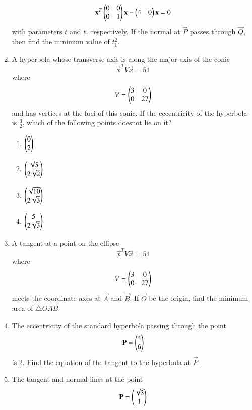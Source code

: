 \documentclass[journal,12pt,twocolumn]{IEEEtran}
\begin{document}
\begin{enumerate}[label=\arabic*.]
\begin{equation}
\mathbf{x}^T\begin{pmatrix}0 & 0 \\ 0 & 1\end{pmatrix}\mathbf{x} -\begin{pmatrix}4 & 0 \end{pmatrix}\mathbf{x} 
 = 0
\end{equation}
with parameters $t$ and $t_1$ respectively.  If the normal at $\vec{P} $ passes through $\vec{Q}$, then find 
the minimum value of $t_1^2$.
\item A hyperbola whose transverse axis is along the major axis of the conic
\begin{equation}
\vec{x}^TV\vec{x} =51
\end{equation}
%
where
\begin{equation}
V = \begin{pmatrix}3 & 0 \\ 0 & 27\end{pmatrix}
\end{equation}
and has vertices at the foci of this conic.  If the eccentricity of the hyperbola is $\frac{3}{2}$, which of 
the following points doesnot lie on it?
\begin{enumerate}
\item $\begin{pmatrix} 0 \\ 2\end{pmatrix}$
\item $\begin{pmatrix}\sqrt{5}  \\ 2\sqrt{2}\end{pmatrix}$
\item $\begin{pmatrix}\sqrt{10}  \\ 2\sqrt{3}\end{pmatrix}$
\item $\begin{pmatrix}5 \\ 2\sqrt{3}\end{pmatrix}$
\end{enumerate}
\item A tangent at a point on the ellipse 
\begin{equation}
\vec{x}^TV\vec{x} =51
\end{equation}
%
where
\begin{equation}
V = \begin{pmatrix}3 & 0 \\ 0 & 27\end{pmatrix}
\end{equation}
%
meets the coordinate axes at  $\vec{A}$  and  $\vec{B}$.  If   $\vec{O}$  be the origin, find the minimum area 
of $\triangle OAB$.
\item The eccentricity of the standard hyperbola passing through the point 
\begin{equation}
\mathbf{P}= \begin{pmatrix}4 \\ 6\end{pmatrix}
\end{equation}
is 2.  Find the equation of the tangent to the hyperbola at $\vec{P}$.
\item The tangent and normal lines at the point 
\begin{equation}
\mathbf{P}= \begin{pmatrix}\sqrt{3} \\ 1\end{pmatrix}
\end{equation}

\end{enumerate}
\end{document}
